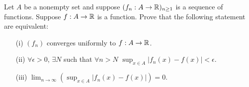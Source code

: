 \documentclass[a4paper]{article}
\begin{document}
\begin{problem}
    Let \( A  \) be a nonempty set and suppose \( ({f}_{n}: A \to \mathbb{R})_{n \geq 1} \) is a sequence of functions. Suppose \( f: A \to \mathbb{R}  \) is a function. Prove that the following statement are equivalent:
    \begin{enumerate}
        \item[(i)] \( ({f}_{n})  \) converges uniformly to \( f: A \to \mathbb{R}  \).
        \item[(ii)] \( \forall \epsilon > 0  \), \( \exists N  \) such that \( \forall n > N  \) \( \sup_{x \in A} | {f}_{n}(x) - f(x) | < \epsilon \).
        \item[(iii)] \( \lim_{ n \to \infty  } (\sup_{x \in A} | {f}_{n}(x) - f(x) | ) = 0  \).
    \end{enumerate}
\end{problem}
\end{document}
